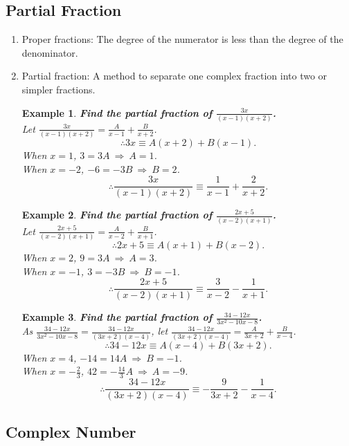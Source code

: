 \documentclass[12pt, a4paper]{article}
\newtheorem{example}{Example}[subsection]
\begin{document}
\subsection{Partial Fraction}
\begin{enumerate}
  \item Proper fractions: The degree of the numerator is less than the degree of the denominator. 
  \item Partial fraction: A method to separate one complex fraction into two or simpler fractions. 
  \begin{example}
    \textbf{Find the partial fraction of $\frac{3x}{(x-1)(x+2)}$.}\\
    Let $\frac{3x}{(x-1)(x+2)}=\frac{A}{x-1}+\frac{B}{x+2}$.
    $$\therefore 3x \equiv A(x+2)+B(x-1).$$
    When $x=1$, $3=3A\ \Rightarrow\ A=1$. \\
    When $x=-2$, $-6=-3B\ \Rightarrow\ B=2$. 
    $$\therefore \frac{3x}{(x-1)(x+2)} \equiv \frac{1}{x-1}+\frac{2}{x+2}.$$
  \end{example}
  \begin{example}
    \textbf{Find the partial fraction of $\frac{2x+5}{(x-2)(x+1)}$.}\\
    Let $\frac{2x+5}{(x-2)(x+1)}=\frac{A}{x-2}+\frac{B}{x+1}$.
    $$\therefore 2x+5 \equiv A(x+1)+B(x-2).$$
    When $x=2$, $9=3A\ \Rightarrow\ A=3$. \\
    When $x=-1$, $3=-3B\ \Rightarrow\ B=-1$. 
    $$\therefore \frac{2x+5}{(x-2)(x+1)}\equiv\frac{3}{x-2}-\frac{1}{x+1}.$$
  \end{example}
  \begin{example}
    \textbf{Find the partial fraction of $\frac{34-12x}{3x^2-10x-8}$.}\\
    As $\frac{34-12x}{3x^2-10x-8}=\frac{34-12x}{(3x+2)(x-4)}$, let $\frac{34-12x}{(3x+2)(x-4)}=\frac{A}{3x+2}+\frac{B}{x-4}$.
    $$\therefore 34-12x \equiv A(x-4)+B(3x+2).$$
    When $x=4$, $-14=14A\ \Rightarrow\ B=-1$. \\
    When $x=-\frac{2}{3}$, $42=-\frac{14}{3}A\ \Rightarrow\ A=-9$. 
    $$\therefore \frac{34-12x}{(3x+2)(x-4)}\equiv-\frac{9}{3x+2}-\frac{1}{x-4}.$$
  \end{example}
\end{enumerate}

\subsection{Complex Number}
\end{document}

